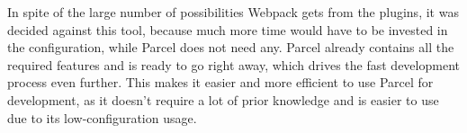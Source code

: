 In spite of the large number of possibilities Webpack gets from the plugins, it was decided against this tool, because much more time would have to be invested in the configuration, while Parcel does not need any. Parcel already contains all the required features and is ready to go right away, which drives the fast development process even further. This makes it easier and more efficient to use Parcel for development, as it doesn't require a lot of prior knowledge and is easier to use due to its low-configuration usage.
